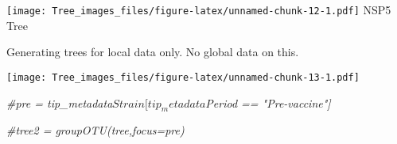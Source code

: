 \documentclass[
]{article}
\newenvironment{Shaded}{\begin{snugshade}}{\end{snugshade}}
\newcommand{\CharTok}[1]{\textcolor[rgb]{0.31,0.60,0.02}{#1}}
\newcommand{\CommentTok}[1]{\textcolor[rgb]{0.56,0.35,0.01}{\textit{#1}}}
\newcommand{\DataTypeTok}[1]{\textcolor[rgb]{0.13,0.29,0.53}{#1}}
\newcommand{\DecValTok}[1]{\textcolor[rgb]{0.00,0.00,0.81}{#1}}
\newcommand{\KeywordTok}[1]{\textcolor[rgb]{0.13,0.29,0.53}{\textbf{#1}}}
\newcommand{\NormalTok}[1]{#1}
\newcommand{\OperatorTok}[1]{\textcolor[rgb]{0.81,0.36,0.00}{\textbf{#1}}}
\newcommand{\OtherTok}[1]{\textcolor[rgb]{0.56,0.35,0.01}{#1}}
\newcommand{\StringTok}[1]{\textcolor[rgb]{0.31,0.60,0.02}{#1}}
\begin{document}
\texttt{[image: Tree\_images\_files/figure-latex/unnamed-chunk-12-1.pdf]}
NSP5 Tree

Generating trees for local data only. No global data on this.

\begin{Shaded}
\end{Shaded}

\texttt{[image: Tree\_images\_files/figure-latex/unnamed-chunk-13-1.pdf]}

\begin{Shaded}
\begin{Highlighting}[]
\CommentTok{#pre = tip_metadata$Strain[tip_metadata$Period == "Pre-vaccine"]}

\CommentTok{#tree2 = groupOTU(tree,focus=pre)}
\end{Highlighting}
\end{Shaded}
\end{document}
